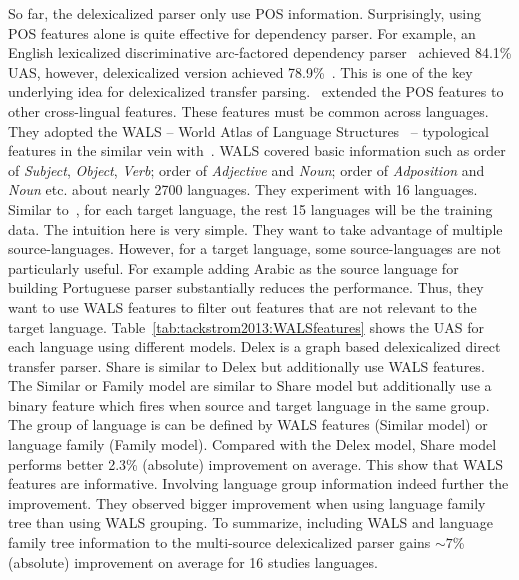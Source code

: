 So far, the delexicalized parser only use POS information. Surprisingly, using POS features alone is quite effective for dependency parser. For example, an English lexicalized discriminative arc-factored dependency parser~\cite{McDonald:2005:NDP} achieved 84.1\% UAS, however, delexicalized version achieved 78.9\%~\cite{tackstrom:2013:NAACL-HLT}. This is one of the key underlying idea for delexicalized transfer parsing.~\textbf{} extended the POS features to other cross-lingual features. These features must be common across languages. They adopted the WALS -- World Atlas of Language Structures~\cite{wals} --  typological features in the similar vein with~\cite{Naseem:2012:SSM}. WALS covered basic information such as order of \textit{Subject}, \textit{Object}, \textit{Verb}; order of \textit{Adjective} and \textit{Noun}; order of \textit{Adposition} and \textit{Noun} etc.  about nearly 2700 languages. They experiment with 16 languages. Similar to~\cite{McDonald:2011:MTD,Sogaard:2011:DPS}, for each target language, the rest 15 languages will be the training data. The intuition here is very simple. They want to take advantage of multiple source-languages. However, for a target language, some source-languages are not particularly useful. For example adding Arabic as the source language for building Portuguese parser substantially reduces the performance. Thus, they want to use WALS features to filter out features that are not relevant to the target language. Table~\ref{tab:tackstrom2013:WALSfeatures} shows the UAS for each language using different models. Delex is a graph based delexicalized direct transfer parser. Share is similar to Delex but additionally use WALS features. The Similar or Family model are similar to Share model but additionally use a binary feature which fires when source and target language in the same group. The group of language is can be defined by WALS features (Similar model) or language family (Family model). Compared with the Delex model, Share model performs better 2.3\% (absolute) improvement on average. This show that WALS features are informative. Involving language group information indeed further the improvement. They observed bigger improvement when using language family tree than using WALS grouping. To summarize, including WALS and language family tree information to the multi-source delexicalized parser gains $\sim 7$\% (absolute) improvement on average for 16 studies languages. 

